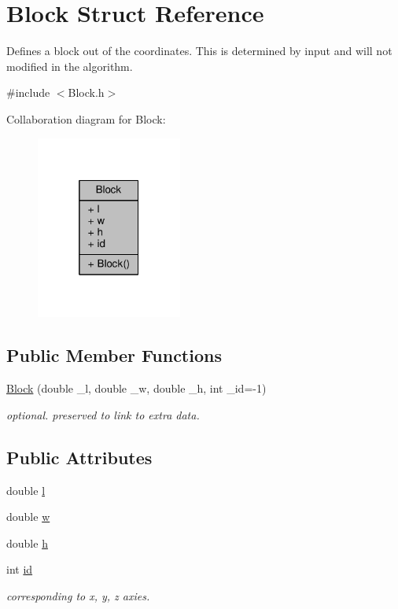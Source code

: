 \hypertarget{structBlock}{}\section{Block Struct Reference}
\label{structBlock}


Defines a block out of the coordinates. This is determined by input and will not modified in the algorithm.  




{\ttfamily \#include $<$Block.\+h$>$}



Collaboration diagram for Block\+:\nopagebreak
\begin{figure}[H]
\begin{center}
\leavevmode
\includegraphics[width=136pt]{structBlock__coll__graph}
\end{center}
\end{figure}
\subsection*{Public Member Functions}
\begin{DoxyCompactItemize}
\item 
\hyperlink{structBlock_a832b4a589a691d3e10cfecc32398ddd0}{Block} (double \+\_\+l, double \+\_\+w, double \+\_\+h, int \+\_\+id=-\/1)
\begin{DoxyCompactList}\small\item\em optional. preserved to link to extra data. \end{DoxyCompactList}\end{DoxyCompactItemize}
\subsection*{Public Attributes}
\begin{DoxyCompactItemize}
\item 
double \hyperlink{structBlock_aad415a5d98d3645561306bf7d5bb22bb}{l}
\item 
double \hyperlink{structBlock_ae072df7850e56bf12d0234773e7eaa46}{w}
\item 
double \hyperlink{structBlock_a27826799e87ce49b8b1b72e7e2384583}{h}
\item 
int \hyperlink{structBlock_a86f38c868a8dab090101db6492078071}{id}
\begin{DoxyCompactList}\small\item\em corresponding to x, y, z axies. \end{DoxyCompactList}\end{DoxyCompactItemize}


